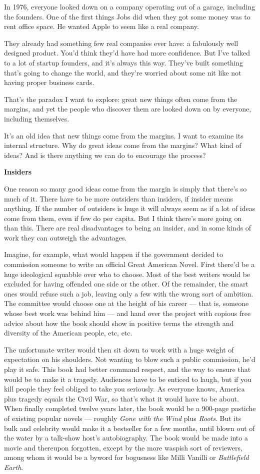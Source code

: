 \documentclass[12pt]{book}
\begin{document}
In 1976, everyone looked down on a company operating out of a garage,
including the founders. One of the first things Jobs did when they got
some money was to rent office space. He wanted Apple to seem like a real
company.

They already had something few real companies ever have: a fabulously
well designed product. You'd think they'd have had more confidence. But
I've talked to a lot of startup founders, and it's always this way.
They've built something that's going to change the world, and they're
worried about some nit like not having proper business cards.

That's the paradox I want to explore: great new things often come from
the margins, and yet the people who discover them are looked down on by
everyone, including themselves.

It's an old idea that new things come from the margins. I want to
examine its internal structure. Why do great ideas come from the
margins? What kind of ideas? And is there anything we can do to
encourage the process?

\textbf{Insiders}

One reason so many good ideas come from the margin is simply that
there's so much of it. There have to be more outsiders than insiders, if
insider means anything. If the number of outsiders is huge it will
always seem as if a lot of ideas come from them, even if few do per
capita. But I think there's more going on than this. There are real
disadvantages to being an insider, and in some kinds of work they can
outweigh the advantages.

Imagine, for example, what would happen if the government decided to
commission someone to write an official Great American Novel. First
there'd be a huge ideological squabble over who to choose. Most of the
best writers would be excluded for having offended one side or the
other. Of the remainder, the smart ones would refuse such a job, leaving
only a few with the wrong sort of ambition. The committee would choose
one at the height of his career --- that is, someone whose best work was
behind him --- and hand over the project with copious free advice about
how the book should show in positive terms the strength and diversity of
the American people, etc, etc.

The unfortunate writer would then sit down to work with a huge weight of
expectation on his shoulders. Not wanting to blow such a public
commission, he'd play it safe. This book had better command respect, and
the way to ensure that would be to make it a tragedy. Audiences have to
be enticed to laugh, but if you kill people they feel obliged to take
you seriously. As everyone knows, America plus tragedy equals the Civil
War, so that's what it would have to be about. When finally completed
twelve years later, the book would be a 900-page pastiche of existing
popular novels --- roughly \emph{Gone with the Wind} plus \emph{Roots}.
But its bulk and celebrity would make it a bestseller for a few months,
until blown out of the water by a talk-show host's autobiography. The
book would be made into a movie and thereupon forgotten, except by the
more waspish sort of reviewers, among whom it would be a byword for
bogusness like Milli Vanilli or \emph{Battlefield Earth}.
\end{document}
